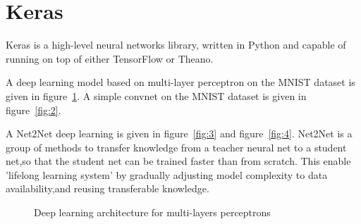 \documentclass{svproc}
\begin{document}
\section{Keras}

Keras\cite{chollet2015keras} is a high-level neural networks library, written in Python\cite{van2007python} and capable of running on top of either TensorFlow\cite{abadi2015tensorflow} or Theano\cite{bergstra2011theano}.


%


%


A deep learning model based on multi-layer perceptron\cite{cirecsan2012deep} on the MNIST dataset is given in figure~\ref{fig:1}.
A simple convnet\cite{sermanet2012convolutional} on the MNIST dataset is given in figure~\ref{fig:2}. 

A Net2Net deep learning is given in figure~\ref{fig:3} and figure~\ref{fig:4}.  Net2Net is a group of methods to transfer knowledge from a teacher neural net to a student net,so that the student net can be trained faster than from scratch. This enable 'lifelong learning system' by gradually adjusting model complexity
    to data availability,and reusing transferable knowledge.


\begin{figure}
\caption{Deep learning architecture for multi-layers perceptrons}
\label{fig:1}       %
\end{figure}
\end{document}
